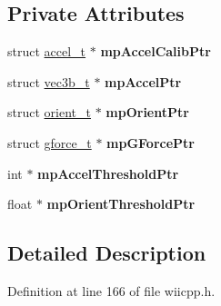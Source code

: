 \subsection*{\-Private \-Attributes}
\begin{DoxyCompactItemize}
\item 
\hypertarget{class_c_accelerometer_a121c813be993f72ad2563fd27f3857a7}{struct \hyperlink{structaccel__t}{accel\-\_\-t} $\ast$ {\bfseries mp\-Accel\-Calib\-Ptr}}\label{class_c_accelerometer_a121c813be993f72ad2563fd27f3857a7}

\item 
\hypertarget{class_c_accelerometer_a9d98ce13ae72eea33a80548a384de565}{struct \hyperlink{structvec3b__t}{vec3b\-\_\-t} $\ast$ {\bfseries mp\-Accel\-Ptr}}\label{class_c_accelerometer_a9d98ce13ae72eea33a80548a384de565}

\item 
\hypertarget{class_c_accelerometer_a9d3e8f3e481f9d1f12e52de03b4dba52}{struct \hyperlink{structorient__t}{orient\-\_\-t} $\ast$ {\bfseries mp\-Orient\-Ptr}}\label{class_c_accelerometer_a9d3e8f3e481f9d1f12e52de03b4dba52}

\item 
\hypertarget{class_c_accelerometer_adeb9c7760b24329e98f6991b934c7237}{struct \hyperlink{structgforce__t}{gforce\-\_\-t} $\ast$ {\bfseries mp\-G\-Force\-Ptr}}\label{class_c_accelerometer_adeb9c7760b24329e98f6991b934c7237}

\item 
\hypertarget{class_c_accelerometer_abc3dac2cc1659a873d328d8f50cd3985}{int $\ast$ {\bfseries mp\-Accel\-Threshold\-Ptr}}\label{class_c_accelerometer_abc3dac2cc1659a873d328d8f50cd3985}

\item 
\hypertarget{class_c_accelerometer_a10e1ee61f93ece8b81f231ddf4898c23}{float $\ast$ {\bfseries mp\-Orient\-Threshold\-Ptr}}\label{class_c_accelerometer_a10e1ee61f93ece8b81f231ddf4898c23}

\end{DoxyCompactItemize}


\subsection{\-Detailed \-Description}


\-Definition at line 166 of file wiicpp.\-h.



